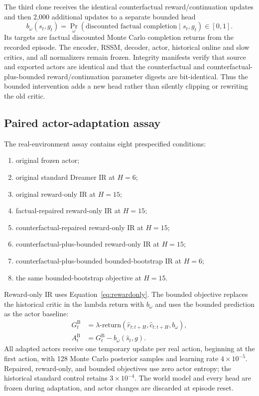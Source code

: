 \documentclass[10pt]{article}
\begin{document}
The third clone receives the identical counterfactual reward/continuation
updates and then 2,000 additional updates to a separate bounded head
\begin{equation}
 b_\omega(s_t,g_t)=\Pr_\omega(\text{discounted factual completion}\mid s_t,g_t)
 \in[0,1].
\end{equation}
Its targets are factual discounted Monte Carlo completion returns from the
recorded episode. The encoder, RSSM, decoder, actor, historical online and slow
critics, and all normalizers remain frozen. Integrity manifests verify that
source and exported actors are identical and that the counterfactual and
counterfactual-plus-bounded reward/continuation parameter digests are
bit-identical. Thus the bounded intervention adds a new head rather than
silently clipping or rewriting the old critic.

\subsection{Paired actor-adaptation assay}

The real-environment assay contains eight prespecified conditions:
\begin{enumerate}
  \item original frozen actor;
  \item original standard Dreamer IR at $H=6$;
  \item original reward-only IR at $H=15$;
  \item factual-repaired reward-only IR at $H=15$;
  \item counterfactual-repaired reward-only IR at $H=15$;
  \item counterfactual-plus-bounded reward-only IR at $H=15$;
  \item counterfactual-plus-bounded bounded-bootstrap IR at $H=6$;
  \item the same bounded-bootstrap objective at $H=15$.
\end{enumerate}
Reward-only IR uses Equation~\ref{eq:rewardonly}. The bounded objective replaces
the historical critic in the lambda return with $b_\omega$ and uses the
bounded prediction as the actor baseline:
\begin{align}
 G_t^{\mathrm{B}} &= \lambda\text{-return}
   (\hat r_{t:t+H},\hat c_{t:t+H},b_\omega),\\
 A_t^{\mathrm{B}} &= G_t^{\mathrm{B}}-b_\omega(\hat s_t,g).
\end{align}
All adapted actors receive one temporary update per real action, beginning at
the first action, with 128 Monte Carlo posterior samples and learning rate
$4\times10^{-5}$. Repaired, reward-only, and bounded objectives use zero actor
entropy; the historical standard control retains $3\times10^{-4}$. The world
model and every head are frozen during adaptation, and actor changes are
discarded at episode reset.
\end{document}
